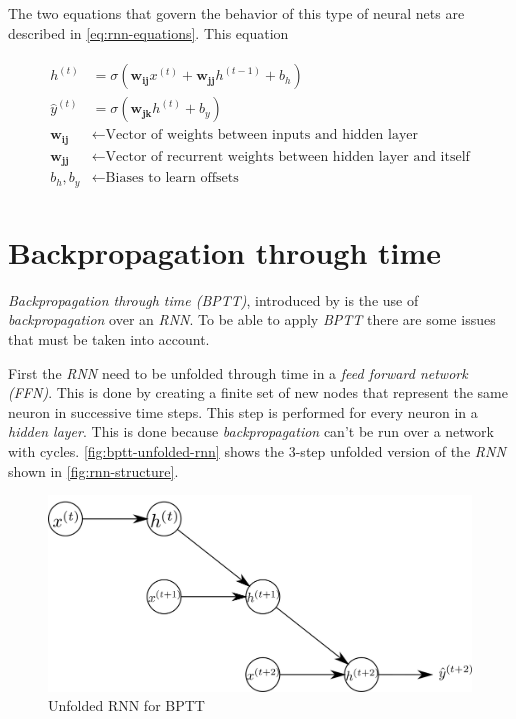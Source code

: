 The two equations that govern the behavior of this type of neural nets
are described in \autoref{eq:rnn-equations}. This equation

\begin{align}
  \begin{split}
    \label{eq:rnn-equations}
    h^{(t)} & = \sigma(\mathbf{w_{ij}} x^{(t)} + \mathbf{w_{jj}}
    h^{(t-1)} + b_h ) \\ 
    \hat{y}^{(t)} & = \sigma(\mathbf{w_{jk}} h^{(t)} + b_y ) \\
    \mathbf{w_{ij}} & \gets \text{Vector of weights between inputs and
      hidden layer} \\ 
    \mathbf{w_{jj}} & \gets \text{Vector of recurrent weights between hidden
      layer and itself} \\
    b_h, b_y & \gets \text{Biases to learn offsets}
  \end{split}
\end{align}

\section{Backpropagation through time}
\label{sec:bp-through-time}

\textit{Backpropagation through time (BPTT)}, introduced by
\cite{werbos1990backpropagation} is the use of
\textit{backpropagation} over an \textit{RNN}. To be able to apply
\textit{BPTT} there are some issues that must be taken into account.

First the \textit{RNN} need to be unfolded through time in a
\textit{feed forward network (FFN)}. This is done by creating a finite
set of new nodes that represent the same neuron in successive time
steps. This step is performed for every neuron in a \textit{hidden
layer}. This is done because \textit{backpropagation} can't be run
over a network with cycles. \autoref{fig:bptt-unfolded-rnn} shows the
3-step unfolded version of the \textit{RNN} shown in
\autoref{fig:rnn-structure}.

\begin{figure}[bth]
  \centering
  \includegraphics[width=.95\linewidth]{gfx/bptt-unfolded-rnn}
  \caption{Unfolded RNN for BPTT}
  \label{fig:bptt-unfolded-rnn}
\end{figure}

